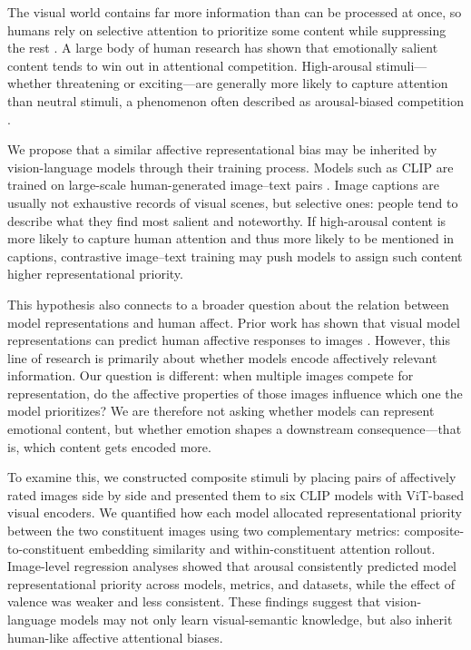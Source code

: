 \documentclass{article}
\begin{document}
The visual world contains far more information than can be processed at once, so humans rely on selective attention to prioritize some content while suppressing the rest \citep{tresilianSelectiveAttentionReaching1999,serencesSelectiveVisualAttention2006,desimoneNeuralMechanismsSelective1995}. A large body of human research has shown that emotionally salient content tends to win out in attentional competition. High-arousal stimuli---whether threatening or exciting---are generally more likely to capture attention than neutral stimuli, a phenomenon often described as arousal-biased competition \citep{hansenFindingFaceCrowd1988a,ohmanEmotionDrivesAttention2001,vogtAllocationSpatialAttention2008b,schimmackAttentionalInterferenceEffects2005a}.

We propose that a similar affective representational bias may be inherited by vision-language models through their training process. Models such as CLIP are trained on large-scale human-generated image--text pairs \citep{radfordLearningTransferableVisual2021a}. Image captions are usually not exhaustive records of visual scenes, but selective ones: people tend to describe what they find most salient and noteworthy. If high-arousal content is more likely to capture human attention and thus more likely to be mentioned in captions, contrastive image--text training may push models to assign such content higher representational priority. %

This hypothesis also connects to a broader question about the relation between model representations and human affect. Prior work has shown that visual model representations can predict human affective responses to images \citep{conwellPerceptualPrimacyFeeling2025}. However, this line of research is primarily about whether models encode affectively relevant information. Our question is different: when multiple images compete for representation, do the affective properties of those images influence which one the model prioritizes? We are therefore not asking whether models can represent emotional content, but whether emotion shapes a downstream consequence---that is, which content gets encoded more.

To examine this, we constructed composite stimuli by placing pairs of affectively rated images side by side and presented them to six CLIP models with ViT-based visual encoders. We quantified how each model allocated representational priority between the two constituent images using two complementary metrics: composite-to-constituent embedding similarity and within-constituent attention rollout. Image-level regression analyses showed that arousal consistently predicted model representational priority across models, metrics, and datasets, while the effect of valence was weaker and less consistent. These findings suggest that vision-language models may not only learn visual-semantic knowledge, but also inherit human-like affective attentional biases.
\end{document}
